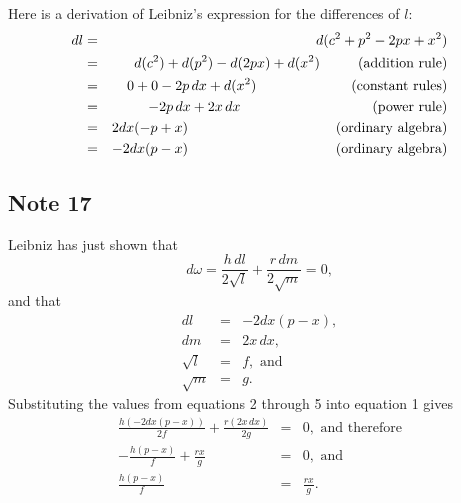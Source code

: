\documentclass[polutonikogreek,english,twoside,openright]{article}
\begin{document}
Here is a derivation of Leibniz's expression for the differences of $l$:
\begin{eqnarray*}
dl & = & d(c^2 + p^2 - 2px + x^2) \\
& = & d(c^2) + d(p^2) -d(2px) + d(x^2) \mbox{\hspace{5.55ex} (addition rule)}\\
& = & 0 + 0 -2p\,dx + d(x^2) \mbox{\hspace{15ex} (constant rules)}\\
& = & -2p\,dx + 2x\,dx \mbox{\hspace{21.15ex} (power rule)}\\
& = & 2dx(-p + x) \mbox{\hspace{23.78ex} (ordinary algebra)}\\
& = & -2dx(p-x) \mbox{\hspace{23.78ex} (ordinary algebra)}
\end{eqnarray*}

\subsection*{Note 17}
\label{cnm17}

Leibniz has just shown that 
\begin{equation} d\omega =  \frac{h\,dl}{2\sqrt{l}} + \frac{r\,dm}{2\sqrt{m}}  =0,
\end{equation}
and that 
\begin{eqnarray}
dl & = & -2dx(p-x),\\
dm & = & 2x\,dx,\\
\sqrt{l} & = & f,\mbox{ and}\\
\sqrt{m} & = & g.
\end{eqnarray}
Substituting the values from equations 2 through 5 into equation 1 gives
\begin{eqnarray*}
\frac{h(-2dx(p-x))}{2f} + \frac{r(2x\,dx)}{2g} & = & 0,\mbox{ and therefore}\\
-\frac{h(p-x)}{f} + \frac{rx}{g} & = & 0, \mbox{ and}\\
\frac{h(p-x)}{f} & = & \frac{rx}{g}.
\end{eqnarray*}
 
\end{document}
